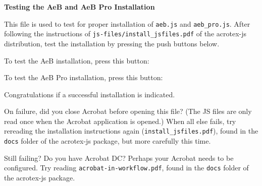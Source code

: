 \documentclass{article}
\let\pkg\textsf
\begin{document}
\begin{center}\bfseries
      Testing the \pkg{AeB} and \pkg{AeB Pro} Installation
\end{center}

This file is used to test for proper installation of \texttt{aeb.js} and
\texttt{aeb\_pro.js}. After following the instructions of
\texttt{js-files/install\_jsfiles.pdf} of the \pkg{acrotex-js} distribution,
test the installation by pressing the push buttons below.


To test the \textsf{AeB} installation, press this button:

To test the \textsf{AeB Pro} installation, press this button:

Congratulations if a successful installation is indicated.

On failure, did you close \textsf{Acrobat} before opening this file? (The JS
files are only read once when the \textsf{Acrobat} application is opened.)
When all else fails, try rereading the installation instructions again
(\texttt{install\_jsfiles.pdf}), found in the \texttt{docs} folder of the \pkg{acrotex-js} package, but more
carefully this time.

Still failing? Do you have \textsf{Acrobat DC}? Perhaps your \textsf{Acrobat}
needs to be configured. Try reading \texttt{acrobat-in-workflow.pdf}, found
in the \texttt{docs} folder of the \pkg{acrotex-js} package.
\end{document}
